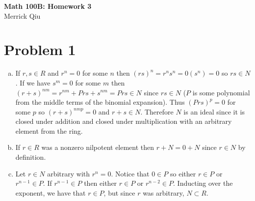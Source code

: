 \documentclass{article}
\begin{document}
\begin{center}
	\huge{\bf Math 100B: Homework 3} \\
	Merrick Qiu
\end{center}

\section*{Problem 1}
\begin{enumerate}[(a)]
	\item If $r,s \in R$ and $r^n = 0$ for some $n$
		then $(rs)^n = r^ns^n = 0(s^n) = 0$ so $rs \in N$.
		If we have $s^m = 0$ for some $m$ then 
		$(r+s)^{nm} = r^{nm} + Prs + s^{nm} = Prs \in N$
		since $rs \in N$
		($P$ is some polynomial from the middle terms of the binomial expansion).
		Thus $(Prs)^p = 0$ for some $p$ so $(r+s)^{nmp} = 0$ and $r+s \in N$.
		Therefore $N$ is an ideal since it is closed under addition and closed under multiplication
		with an arbitrary element from the ring.
	\item If $r \in R$ was a nonzero nilpotent element then $r+N = 0+N$ since $r \in N$ by definition.
	\item Let $r \in N$ arbitrary with $r^n = 0$. 
	Notice that $0 \in P$ so either $r \in P$ or $r^{n-1} \in P$.
	If $r^{n-1} \in P$ then either $r \in P$ or $r^{n-2} \in P$.
	Inducting over the exponent, we have that $r\in P$, but since $r$ was arbitrary,
	$N \subset R$.
\end{enumerate}

\newpage 
\end{document}
